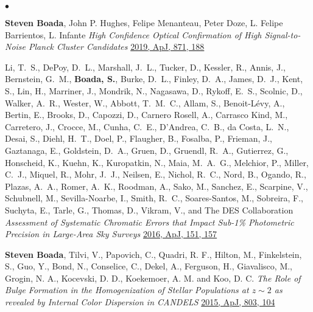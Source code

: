 \documentclass[margin,line, 11pt]{res}
\newenvironment{list2}{
  \begin{list}{$\bullet$}{%
      \setlength{\itemsep}{0in}
      \setlength{\parsep}{0in} \setlength{\parskip}{0in}
      \setlength{\topsep}{0in} \setlength{\partopsep}{0in}
      \setlength{\leftmargin}{0.2in}}}{\end{list}}
\begin{document}
\begin{resume}
\begin{list2}
\item \textbf{Steven Boada}, John P. Hughes, Felipe Menanteau, Peter Doze, L. Felipe Barrientos, L. Infante \emph{High Confidence Optical Confirmation of High Signal-to-Noise Planck Cluster Candidates} \href{https://ui.adsabs.harvard.edu/abs/2019ApJ...871..188B/abstract}{2019, ApJ, 871, 188}

\item Li, T.~S., DePoy, D.~L., Marshall, J.~L., Tucker, D., Kessler, R., Annis, J., Bernstein, G.~M., \textbf{Boada, S.}, Burke, D.~L., Finley, D.~A., James, D.~J., Kent, S., Lin, H., Marriner, J., Mondrik, N., Nagasawa, D., Rykoff, E.~S., Scolnic, D., Walker, A.~R., Wester, W., Abbott, T.~M.~C., Allam, S., Benoit-L\'evy, A., Bertin, E., Brooks, D., Capozzi, D., Carnero Rosell, A., Carrasco Kind, M., Carretero, J., Crocce, M., Cunha, C.~E., D'Andrea, C.~B., da Costa, L.~N., Desai, S., Diehl, H.~T., Doel, P., Flaugher, B., Fosalba, P., Frieman, J., Gaztanaga, E., Goldstein, D.~A., Gruen, D., Gruendl, R.~A., Gutierrez, G., Honscheid, K., Kuehn, K., Kuropatkin, N., Maia, M.~A.~G., Melchior, P., Miller, C.~J., Miquel, R., Mohr, J.~J., Neilsen, E., Nichol, R.~C., Nord, B., Ogando, R., Plazas, A.~A., Romer, A.~K., Roodman, A., Sako, M., Sanchez, E., Scarpine, V., Schubnell, M., Sevilla-Noarbe, I., Smith, R.~C., Soares-Santos, M., Sobreira, F., Suchyta, E., Tarle, G., Thomas, D., Vikram, V., and The DES Collaboration \emph{Assessment of Systematic Chromatic
Errors that Impact Sub-1\% Photometric Precision in Large-Area Sky Surveys} \href{http://adsabs.harvard.edu/abs/2016AJ....151..157L}{2016, ApJ, 151, 157}

\item \textbf{Steven Boada}, Tilvi, V., Papovich, C., Quadri, R. F., Hilton, M., Finkelstein, S., Guo, Y., Bond, N., Conselice, C., Dekel, A., Ferguson, H., Giavalisco, M., Grogin, N. A., Kocevski, D. D., Koekemoer, A. M. and Koo, D. C. \emph{The Role of Bulge Formation in the Homogenization of Stellar Populations at $z\sim2$ as revealed by Internal Color Dispersion in CANDELS} \href{http://adsabs.harvard.edu/abs/2015ApJ...803..104B}{2015, ApJ, 803, 104}
\end{list2}


\end{resume}
\end{document}
